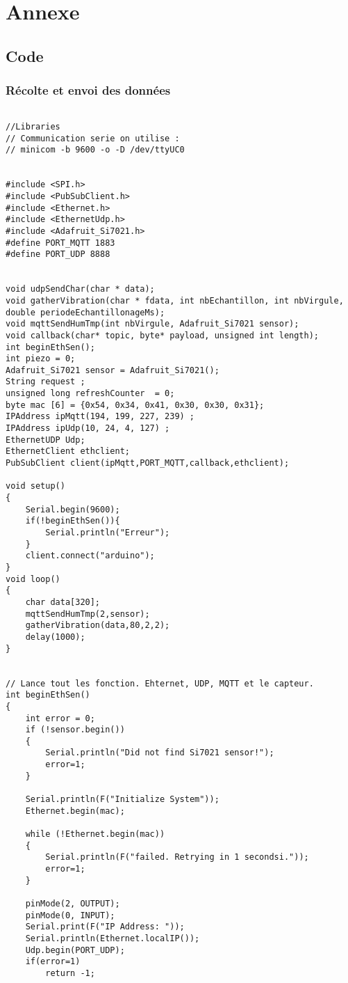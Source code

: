 
\section*{Annexe}
\subsection*{Code}
\subsubsection*{Récolte et envoi des données}
\begin{scriptsize}
\begin{lstlisting}

//Libraries
// Communication serie on utilise :
// minicom -b 9600 -o -D /dev/ttyUC0


#include <SPI.h>
#include <PubSubClient.h>
#include <Ethernet.h>
#include <EthernetUdp.h>
#include <Adafruit_Si7021.h>
#define PORT_MQTT 1883
#define PORT_UDP 8888


void udpSendChar(char * data);
void gatherVibration(char * fdata, int nbEchantillon, int nbVirgule, double periodeEchantillonageMs);
void mqttSendHumTmp(int nbVirgule, Adafruit_Si7021 sensor);
void callback(char* topic, byte* payload, unsigned int length);
int beginEthSen();
int piezo = 0;
Adafruit_Si7021 sensor = Adafruit_Si7021();
String request ;
unsigned long refreshCounter  = 0;
byte mac [6] = {0x54, 0x34, 0x41, 0x30, 0x30, 0x31};
IPAddress ipMqtt(194, 199, 227, 239) ;
IPAddress ipUdp(10, 24, 4, 127) ;
EthernetUDP Udp;
EthernetClient ethclient; 
PubSubClient client(ipMqtt,PORT_MQTT,callback,ethclient); 

void setup() 
{
	Serial.begin(9600);
	if(!beginEthSen()){
		Serial.println("Erreur");
	}
	client.connect("arduino");
}
void loop() 
{
	char data[320];
	mqttSendHumTmp(2,sensor);
	gatherVibration(data,80,2,2);
	delay(1000);
}


// Lance tout les fonction. Ehternet, UDP, MQTT et le capteur. 
int beginEthSen()
{
	int error = 0;
	if (!sensor.begin()) 
	{
		Serial.println("Did not find Si7021 sensor!");
		error=1;
	}

	Serial.println(F("Initialize System"));
	Ethernet.begin(mac);

	while (!Ethernet.begin(mac)) 
	{
		Serial.println(F("failed. Retrying in 1 secondsi."));
		error=1;
	}

	pinMode(2, OUTPUT);
	pinMode(0, INPUT);
	Serial.print(F("IP Address: "));
	Serial.println(Ethernet.localIP());
	Udp.begin(PORT_UDP);
	if(error=1)
		return -1;


\end{lstlisting}
\end{scriptsize}
